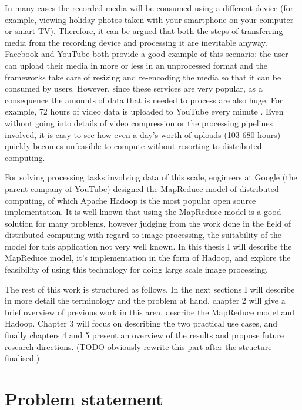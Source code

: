 \documentclass [12pt,a4paper]{report}
\begin{document}
In many cases the recorded media will be consumed using a different device (for example, viewing holiday photos taken with your smartphone on your computer or smart TV). Therefore, it can be argued that both the steps of transferring media from the recording device and processing it are inevitable anyway. Facebook and YouTube both provide a good example of this scenario: the user can upload their media in more or less in an unprocessed format and the frameworks take care of resizing and re-encoding the media so that it can be consumed by users. However, since these services are very popular, as a consequence the amounts of data that is needed to process are also huge. For example, 72 hours of video data is uploaded to YouTube every minute \cite{youtube_stats}. Even without going into details of video compression or the processing pipelines involved, it is easy to see how even a day's worth of uploads (103 680 hours) quickly becomes unfeasible to compute without resorting to distributed computing.

For solving processing tasks involving data of this scale, engineers at Google (the parent company of YouTube) designed the MapReduce model of distributed computing, of which Apache Hadoop is the most popular open source implementation. It is well known that using the MapReduce model is a good solution for many problems, however judging from the work done in the field of distributed computing with regard to image processing, the suitability of the model for this application not very well known. In this thesis I will describe the MapReduce model, it's implementation in the form of Hadoop, and explore the feasibility of using this technology for doing large scale image processing.

The rest of this work is structured as follows. In the next sections I will describe in more detail the terminology and the problem at hand, chapter 2 will give a brief overview of previous work in this area, describe the MapReduce model and Hadoop. Chapter 3 will focus on describing the two practical use cases, and finally chapters 4 and 5 present an overview of the results and propose future research directions. (TODO obviously rewrite this part after the structure finalised.) %

\section{Problem statement}
\end{document}
